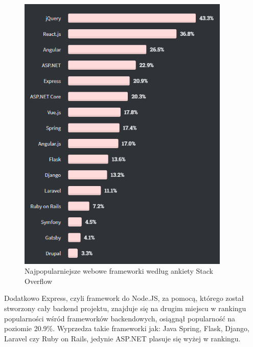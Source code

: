\documentclass[12pt]{article}
\begin{document}
\begin{sloppypar}
{{\begin{figure}[H]
      \includegraphics[width=0.9\textwidth]{most_popular_web_frameworks.PNG}
      \caption{Najpopularniejsze webowe frameworki według ankiety Stack Overflow\cite{stack-survey}}
      \label{fig:web-frameworks}
    \end{figure}
    Dodatkowo Express, czyli framework do Node.JS, za pomocą, którego został stworzony cały backend projektu, znajduje się na drugim miejscu w rankingu popularności 
    wśród frameworków backendowych, osiągnął popularność na poziomie 20.9\%. Wyprzedza takie frameworki jak: Java Spring, Flask, Django, Laravel czy Ruby on Rails, 
    jedynie ASP.NET plasuje się wyżej w rankingu. 
  }
}
\end{sloppypar}
\end{document}
